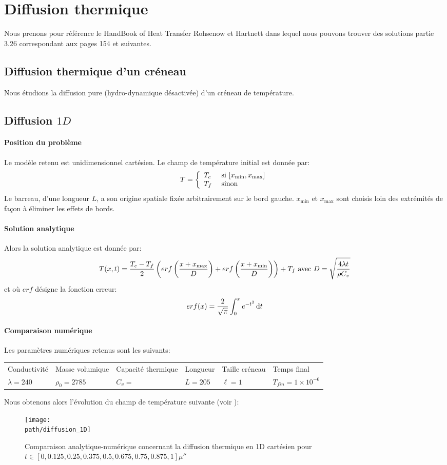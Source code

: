 \documentclass[10pt]{book}
\def\path{./fig}
\begin{document}
\section{Diffusion thermique}
Nous prenons pour référence le \og HandBook of Heat Transfer \fg{} Rohsenow et Hartnett dans lequel nous pouvons trouver des solutions partie 3.26 correspondant aux pages 154 et suivantes.
\FloatBarrier
\subsection{Diffusion thermique d'un créneau}
Nous étudions la diffusion pure (hydro-dynamique désactivée) d'un créneau de température.
\subsection{Diffusion $1D$}
\paragraph{Position du problème}
Le modèle retenu est unidimensionnel cartésien. Le champ de température initial est donnée par:
$$T=\left\lbrace\begin{array}{ll}
T_{c} &\text{ si } [x_{\min},x_{\max}]\\
T_{f} & \text{ sinon }
\end{array}\right.$$
Le barreau, d'une longueur $L$, a son origine spatiale fixée arbitrairement sur le bord gauche. $x_{\min}$ et $x_{\max}$ sont choisis loin des extrémités de façon à éliminer les effets de bords. 
\paragraph{Solution analytique}
Alors la solution analytique est donnée par:
$$T(x,t)=\dfrac{T_{c}-T_{f}}{2}\left(erf\left(\dfrac{x+x_{\max}}{D}\right)+erf\left(\dfrac{x+x_{\min}}{D}\right)\right)+T_{f} \text{ avec } D=\sqrt{\dfrac{4\lambda t}{\rho C_{v}}}$$
et où $erf$ désigne la fonction erreur:
$$erf(x)=\dfrac{2}{\sqrt{\pi}}\int_{0}^{x} e^{-t^{2}}\,\mathrm{d}t$$
\paragraph{Comparaison numérique} Les paramètres numériques retenus sont les suivants:
\begin{table}[h!]
\centering \begin{tabular}{llllll}\hline
Conductivité & Masse volumique & Capacité thermique & Longueur & Taille créneau  & Temps final\\
$\lambda=240$ & $\rho_{0}=2785$ & $C_{v}=$ & $L=205$ & $\ell=1$ & $T_{fin}=1\times 10^{-6}$\\\hline
\end{tabular}
\end{table}
Nous obtenons alors l'évolution du champ de température suivante (voir ):
\begin{figure}[h!]
\centering\texttt{[image: \\path/diffusion\_1D]}
\caption{Comparaison analytique-numérique concernant la diffusion thermique en 1D cartésien pour $t\in[0,0.125,0.25,0.375,0.5,0.675,0.75,0.875,1]\mu\second$}
\label{fig:diffusion_1D}
\end{figure}
\end{document}
